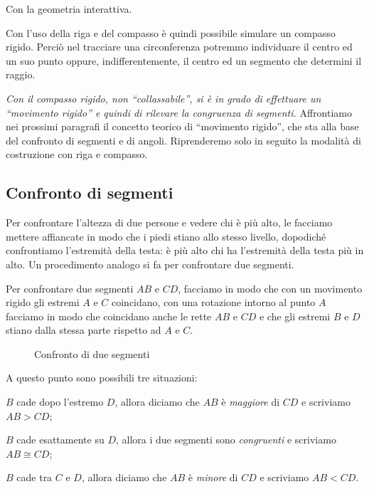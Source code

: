 Con la geometria interattiva.



Con l'uso della riga e del compasso è quindi possibile simulare un compasso 
rigido. 
Perciò nel tracciare una circonferenza potremmo individuare il centro ed un suo 
punto oppure, indifferentemente, il centro ed un segmento che determini il 
raggio.

\textit{Con il compasso rigido, non ``collassabile'', si è in grado di 
effettuare un ``movimento rigido'' e quindi di rilevare la congruenza di 
segmenti.}
Affrontiamo nei prossimi paragrafi il concetto teorico di ``movimento rigido'', 
che sta alla base del confronto di segmenti e di angoli. Riprenderemo solo in 
seguito la modalità di costruzione con riga e compasso.

\subsection{Confronto di segmenti}

Per confrontare l'altezza di due persone e vedere chi è più alto, le 
facciamo mettere affiancate in modo che i piedi stiano allo stesso 
livello, dopodiché confrontiamo l'estremità della testa: è più alto 
chi ha l'estremità della testa più in alto. Un procedimento analogo 
si fa per confrontare due segmenti.

Per confrontare due segmenti $AB$ e $CD$, facciamo in modo che con un 
movimento rigido gli estremi $A$ e $C$ coincidano, con una rotazione 
intorno al punto $A$ facciamo in  modo che coincidano anche le rette 
$AB$ e $CD$ e che gli estremi $B$ e $D$ stiano dalla stessa parte 
rispetto ad $A$ e $C$.


\begin{inaccessibleblock}
 \begin{figure}[htb]
\centering
\caption{Confronto di due segmenti}
\end{figure}
\end{inaccessibleblock}

A questo punto sono possibili tre situazioni:
\begin{itemize*}
\item $B$ cade dopo l'estremo $D$, allora diciamo che $AB$ è 
\emph{maggiore} di $CD$ e scriviamo $AB>CD$;
\item $B$ cade esattamente su $D$, allora i due segmenti sono 
\emph{congruenti} e scriviamo $AB\cong CD$;
\item $B$ cade tra $C$ e $D$, allora diciamo che $AB$ è \emph{minore} 
di $CD$ e scriviamo $AB<CD$.
\end{itemize*}

